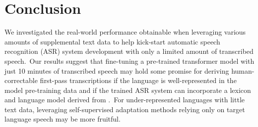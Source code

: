 \documentclass[main.tex]{subfiles}
\begin{document}


\section{Conclusion}

We investigated the real-world performance obtainable when leveraging various amounts of supplemental text data to help kick-start automatic speech recognition (ASR) system development with only a limited amount of transcribed speech.~Our results suggest that fine-tuning a pre-trained transformer model with just 10 minutes of transcribed speech may hold some promise for deriving human-correctable first-pass transcriptions if the language is well-represented in the model pre-training data and if the trained ASR system can incorporate a lexicon and language model derived from .~For under-represented languages with little text data, leveraging self-supervised adaptation methods relying only on target language speech may be more fruitful.
\end{document}
